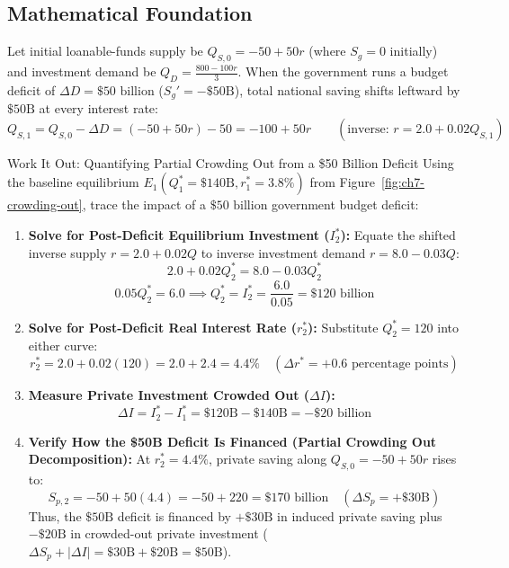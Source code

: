 \documentclass[11pt,letterpaper]{article}
\begin{document}
\subsection*{Mathematical Foundation}
Let initial loanable-funds supply be $Q_{S,0} = -50 + 50r$ (where $S_g = 0$ initially) and investment demand be $Q_D = \frac{800 - 100r}{3}$. When the government runs a budget deficit of $\Delta D = \$50\text{ billion}$ ($S_g' = -\$50\text{B}$), total national saving shifts leftward by $\$50\text{B}$ at every interest rate:
\begin{equation}
Q_{S,1} = Q_{S,0} - \Delta D = (-50 + 50r) - 50 = -100 + 50r \qquad \left(\text{inverse: } r = 2.0 + 0.02Q_{S,1}\right)
\end{equation}

\begin{examplecase}{Work It Out: Quantifying Partial Crowding Out from a \$50 Billion Deficit}
Using the baseline equilibrium $E_1(Q_1^* = \$140\text{B}, r_1^* = 3.8\%)$ from Figure~\ref{fig:ch7-crowding-out}, trace the impact of a $\$50\text{ billion}$ government budget deficit:
\begin{enumerate}
  \item \textbf{Solve for Post-Deficit Equilibrium Investment ($I_2^*$):} Equate the shifted inverse supply $r = 2.0 + 0.02Q$ to inverse investment demand $r = 8.0 - 0.03Q$:
  $$2.0 + 0.02Q_2^* = 8.0 - 0.03Q_2^*$$
  $$0.05Q_2^* = 6.0 \implies Q_2^* = I_2^* = \frac{6.0}{0.05} = \$120\text{ billion}$$
  \item \textbf{Solve for Post-Deficit Real Interest Rate ($r_2^*$):} Substitute $Q_2^* = 120$ into either curve:
  $$r_2^* = 2.0 + 0.02(120) = 2.0 + 2.4 = 4.4\% \quad (\Delta r^* = +0.6\text{ percentage points})$$
  \item \textbf{Measure Private Investment Crowded Out ($\Delta I$):}
  $$\Delta I = I_2^* - I_1^* = \$120\text{B} - \$140\text{B} = -\$20\text{ billion}$$
  \item \textbf{Verify How the \$50B Deficit Is Financed (Partial Crowding Out Decomposition):}
  At $r_2^* = 4.4\%$, private saving along $Q_{S,0} = -50 + 50r$ rises to:
  $$S_{p,2} = -50 + 50(4.4) = -50 + 220 = \$170\text{ billion} \quad (\Delta S_p = +\$30\text{B})$$
  Thus, the $\$50\text{B}$ deficit is financed by $+\$30\text{B}$ in induced private saving plus $-\$20\text{B}$ in crowded-out private investment ($\Delta S_p + |\Delta I| = \$30\text{B} + \$20\text{B} = \$50\text{B}$).
\end{enumerate}
\end{examplecase}
\end{document}
